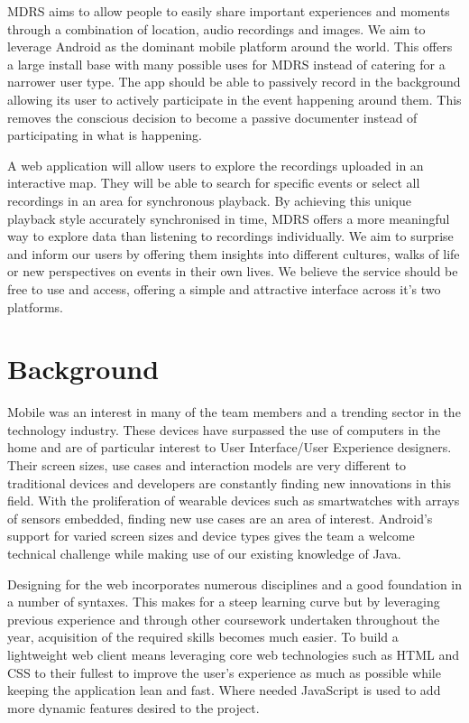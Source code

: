 \documentclass{l3proj}
\begin{document}
MDRS aims to allow people to easily share important experiences and moments through a combination of location, audio recordings and images. We aim to leverage Android as the dominant mobile platform around the world. This offers a large install base with many possible uses for MDRS instead of catering for a narrower user type. The app should be able to passively record in the background allowing its user to actively participate in the event happening around them. This removes the conscious decision to become a passive documenter instead of participating in what is happening.

A web application will allow users to explore the recordings uploaded in an interactive map. They will be able to search for specific events or select all recordings in an area for synchronous playback. By achieving this unique playback style accurately synchronised in time, MDRS offers a more meaningful way to explore data than listening to recordings individually. We aim to surprise and inform our users by offering them insights into different cultures, walks of life or new perspectives on events in their own lives. We believe the service should be free to use and access, offering a simple and attractive interface across it's two platforms.

\section{Background}
Mobile was an interest in many of the team members and a trending sector in the technology industry. These devices have surpassed the use of computers in the home and are of particular interest to User Interface/User Experience designers. Their screen sizes, use cases and interaction models are very different to traditional devices and developers are constantly finding new innovations in this field. With the proliferation of wearable devices such as smartwatches\cite{smartwatches} with arrays of sensors embedded, finding new use cases are an area of interest.  Android’s support for varied screen sizes and device types gives the team a welcome technical challenge while making use of our existing knowledge of Java.

Designing for the web incorporates numerous disciplines and a good foundation in a number of syntaxes. This makes for a steep learning curve but by leveraging previous experience and through other coursework undertaken throughout the year, acquisition of the required skills becomes much easier. To build a lightweight web client means leveraging core web technologies such as \gls{HTML} and \gls{CSS} to their fullest to improve the user’s experience as much as possible while keeping the application lean and fast. Where needed \gls{JavaScript} is used to add more dynamic features desired to the project.
\end{document}

